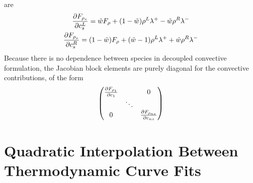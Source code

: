 are
\begin{gather}
  \frac{\partial F_{\rho_s}}{\partial c^L_s} = \tilde{w} F_\rho+(1-\tilde{w})\rho^L\lambda^+ - \tilde{w} \rho^R\lambda^- \\
  \frac{\partial F_{\rho_s}}{\partial c^R_s} = (1-\tilde{w}) F_\rho+(\tilde{w}-1)\rho^L\lambda^+ + \tilde{w}\rho^R\lambda^- 
  \label{dc-sp-linearizations}
\end{gather}
Because there is no dependence between species in decoupled convective
formulation, the Jacobian block elements are purely diagonal for the convective
contributions, of the form
\begin{equation} 
  \begin{pmatrix} 
    \frac{\partial F_{\rho_1}}{\partial c_1} & & 0 \\ 
    & \ddots & \\ 
    0 & & \frac{\partial F_{\rho_{ns}}}{\partial c_{ns}}
  \end{pmatrix}
  \label{dc-diag-Jacobian}
\end{equation}

\section{Quadratic Interpolation Between Thermodynamic Curve Fits}
\label{sec:quad-cp-blending}

